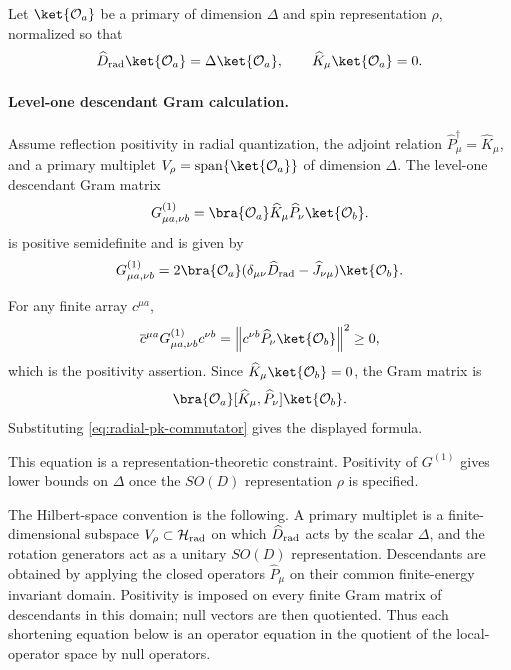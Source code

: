Let \(\ket{\mathcal O_a}\) be a primary of dimension \(\Delta\) and spin
representation \(\rho\), normalized so that
\[
  \widehat D_{\rm rad}\ket{\mathcal O_a}=\Delta\ket{\mathcal O_a},
  \qquad
  \widehat K_\mu\ket{\mathcal O_a}=0.
\]

\paragraph{Level-one descendant Gram calculation.}
Assume reflection positivity in radial quantization, the adjoint relation
\(\widehat P_\mu^\dagger=\widehat K_\mu\), and a primary multiplet
\(V_\rho=\operatorname{span}\{\ket{\mathcal O_a}\}\) of dimension
\(\Delta\).  The level-one descendant Gram matrix
\begin{equation}
  G_{\mu a,\nu b}^{(1)}
  =
  \bra{\mathcal O_a}\widehat K_\mu\widehat P_\nu\ket{\mathcal O_b}.
  \label{eq:level-one-gram-general}
\end{equation}
is positive semidefinite and is given by
\begin{equation}
  G_{\mu a,\nu b}^{(1)}
  =
  2
  \bra{\mathcal O_a}
  (\delta_{\mu\nu}\widehat D_{\rm rad}-\widehat J_{\nu\mu})
  \ket{\mathcal O_b}.
\end{equation}

For any finite array \(c^{\mu a}\),
\[
  \overline c^{\mu a}G^{(1)}_{\mu a,\nu b}c^{\nu b}
  =
  \left\|
    c^{\nu b}\widehat P_\nu\ket{\mathcal O_b}
  \right\|^2
  \ge0,
\]
which is the positivity assertion.  Since
\(\widehat K_\mu\ket{\mathcal O_b}=0\), the Gram matrix is
\[
  \bra{\mathcal O_a}[\widehat K_\mu,\widehat P_\nu]\ket{\mathcal O_b}.
\]
Substituting \eqref{eq:radial-pk-commutator} gives the displayed formula.

This equation is a representation-theoretic constraint.  Positivity of
\(G^{(1)}\) gives lower bounds on \(\Delta\) once the \(SO(D)\) representation
\(\rho\) is specified.

The Hilbert-space convention is the following.  A primary multiplet is a
finite-dimensional subspace \(V_\rho\subset\mathcal H_{\rm rad}\) on which
\(\widehat D_{\rm rad}\) acts by the scalar \(\Delta\), and the rotation generators act
as a unitary \(SO(D)\) representation.  Descendants are obtained by applying
the closed operators \(\widehat P_\mu\) on their common finite-energy
invariant domain.  Positivity is imposed on every finite Gram matrix of
descendants in this domain; null vectors are then quotiented.  Thus each
shortening equation below is an operator equation in the quotient of the
local-operator space by null operators.

